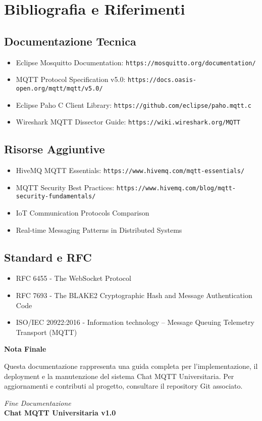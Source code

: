 \documentclass[12pt,a4paper]{article}
\begin{document}
\section{Bibliografia e Riferimenti}

\subsection{Documentazione Tecnica}
\begin{itemize}
    \item Eclipse Mosquitto Documentation: \texttt{https://mosquitto.org/documentation/}
    \item MQTT Protocol Specification v5.0: \texttt{https://docs.oasis-open.org/mqtt/mqtt/v5.0/}
    \item Eclipse Paho C Client Library: \texttt{https://github.com/eclipse/paho.mqtt.c}
    \item Wireshark MQTT Dissector Guide: \texttt{https://wiki.wireshark.org/MQTT}
\end{itemize}

\subsection{Risorse Aggiuntive}
\begin{itemize}
    \item HiveMQ MQTT Essentials: \texttt{https://www.hivemq.com/mqtt-essentials/}
    \item MQTT Security Best Practices: \texttt{https://www.hivemq.com/blog/mqtt-security-fundamentals/}
    \item IoT Communication Protocols Comparison
    \item Real-time Messaging Patterns in Distributed Systems
\end{itemize}

\subsection{Standard e RFC}
\begin{itemize}
    \item RFC 6455 - The WebSocket Protocol
    \item RFC 7693 - The BLAKE2 Cryptographic Hash and Message Authentication Code
    \item ISO/IEC 20922:2016 - Information technology -- Message Queuing Telemetry Transport (MQTT)
\end{itemize}

\begin{infobox}
\textbf{Nota Finale}

Questa documentazione rappresenta una guida completa per l'implementazione, il deployment e la manutenzione del sistema Chat MQTT Universitaria. Per aggiornamenti e contributi al progetto, consultare il repository Git associato.
\end{infobox}

\vfill
\centering
\textit{Fine Documentazione} \\
\textbf{Chat MQTT Universitaria v1.0}
\end{document}
